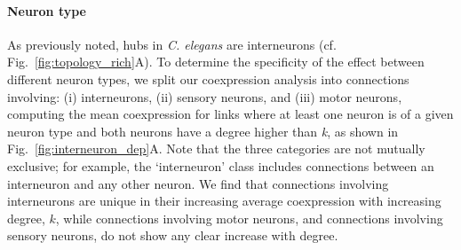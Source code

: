 \documentclass[10pt,letterpaper]{article}
\begin{document}




\paragraph{Neuron type}
As previously noted, hubs in \emph{C. elegans} are interneurons \cite{Towlson:2013gf} (cf. Fig.~\ref{fig:topology_rich}A).
To determine the specificity of the effect between different neuron types, we split our coexpression analysis into connections involving: (i) interneurons, (ii) sensory neurons, and (iii) motor neurons, computing the mean coexpression for links where at least one neuron is of a given neuron type and both neurons have a degree higher than \textit{k}, as shown in Fig.~\ref{fig:interneuron_dep}A.
Note that the three categories are not mutually exclusive; for example, the `interneuron' class includes connections between an interneuron and any other neuron.
We find that connections involving interneurons are unique in their increasing average coexpression with increasing degree, $k$, while connections involving motor neurons, and connections involving sensory neurons, do not show any clear increase with degree.
\end{document}
